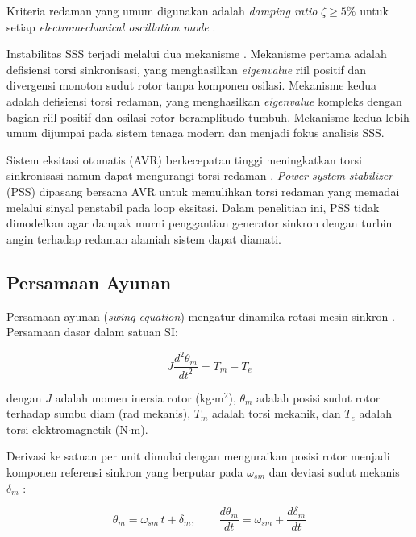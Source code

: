 Kriteria redaman yang umum digunakan adalah \textit{damping ratio} $\zeta \geq 5\%$
untuk setiap \textit{electromechanical oscillation mode} \cite{kundur1994power}.

Instabilitas SSS terjadi melalui dua mekanisme \cite{kundur1994power}. Mekanisme
pertama adalah defisiensi torsi sinkronisasi, yang menghasilkan \textit{eigenvalue}
riil positif dan divergensi monoton sudut rotor tanpa komponen osilasi. Mekanisme
kedua adalah defisiensi torsi redaman, yang menghasilkan \textit{eigenvalue} kompleks
dengan bagian riil positif dan osilasi rotor beramplitudo tumbuh. Mekanisme kedua
lebih umum dijumpai pada sistem tenaga modern dan menjadi fokus analisis SSS.

Sistem eksitasi otomatis (AVR) berkecepatan tinggi meningkatkan torsi sinkronisasi
namun dapat mengurangi torsi redaman \cite{kundur1994power}. \textit{Power system
stabilizer} (PSS) dipasang bersama AVR untuk memulihkan torsi redaman yang memadai
melalui sinyal penstabil pada loop eksitasi. Dalam penelitian ini, PSS tidak
dimodelkan agar dampak murni penggantian generator sinkron dengan turbin angin
terhadap redaman alamiah sistem dapat diamati.

\subsection{Persamaan Ayunan}

Persamaan ayunan (\textit{swing equation}) mengatur dinamika rotasi mesin sinkron
\cite{sauer2006power}. Persamaan dasar dalam satuan SI:

\begin{equation}
  J\frac{d^2\theta_m}{dt^2} = T_m - T_e
  \label{eq:swing-basic}
\end{equation}

dengan $J$ adalah momen inersia rotor (kg$\cdot$m$^2$), $\theta_m$ adalah posisi sudut
rotor terhadap sumbu diam (rad mekanis), $T_m$ adalah torsi mekanik, dan $T_e$ adalah
torsi elektromagnetik (N$\cdot$m).

Derivasi ke satuan per unit dimulai dengan menguraikan posisi rotor menjadi komponen
referensi sinkron yang berputar pada $\omega_{sm}$ dan deviasi sudut mekanis $\delta_m$
\cite{kundur1994power}:

\begin{equation}
  \theta_m = \omega_{sm}\,t + \delta_m, \qquad
  \frac{d\theta_m}{dt} = \omega_{sm} + \frac{d\delta_m}{dt}
  \label{eq:swing-decomp}
\end{equation}

